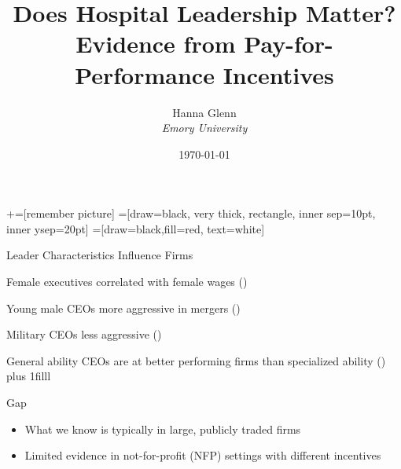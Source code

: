 \documentclass[notes,11pt, aspectratio=169]{beamer}
\title[]{\textcolor{sage}{Does Hospital Leadership Matter? \\Evidence from Pay-for-Performance Incentives}}
\author[]{Hanna Glenn\\ \textit{Emory University}}
\date{\today}
\newcommand{\btVFill}{\vskip0pt plus 1filll}
\newenvironment{wideitemize}{\itemize\addtolength{\itemsep}{10pt}}{\enditemize}
\begin{document}
\newcommand\marktopleft[1]{%
    \tikz[overlay,remember picture] 
        \node (marker-#1-a) at (-.3em,.3em) {};%
}
\newcommand\markbottomright[2]{%
    \tikz[overlay,remember picture] 
        \node (marker-#1-b) at (0em,0em) {};%
}
+=[remember picture] 
 =[draw=black, very thick, rectangle, inner sep=10pt, inner ysep=20pt]
 =[draw=black,fill=red, text=white]

\begin{frame}
\maketitle
\end{frame}

\begin{frame}{Leader Characteristics Influence Firms}

    \vspace{5mm}

    \begin{wideitemize}
        \item Female executives correlated with female wages (\cite{flabbi2019female})
        \item Young male CEOs more aggressive in mergers (\cite{levi2010deal})
        \item Military CEOs less aggressive (\cite{benmelech2015military})
        \item General ability CEOs are at better performing firms than specialized ability (\cite{custodio2013generalists})
    \end{wideitemize}
    \btVFill \pause

    \begin{block}{Gap}
        \begin{itemize}
            \item What we know is typically in large, publicly traded firms
            \item Limited evidence in not-for-profit (NFP) settings with different incentives
        \end{itemize}
    \end{block}

\end{frame}
\end{document}
